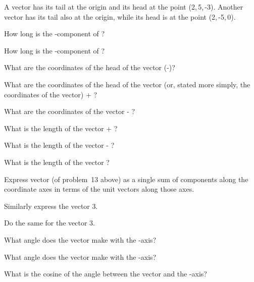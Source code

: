 {\begin{one-digit-list}
\item [13.] A vector  has its tail at the origin and its head at the
point (2,\,5,\,-3).
Another vector  has its tail also at the origin, while its head is at
the point (2,\,-5,\,0).
\begin{one-digit-list}
\item [a.] How long is the -component of ?
\item [b.] How long is the -component of ?
\item [c.] What are the coordinates of the head of the vector (-)?
\item [d.] What are the coordinates of the head of the vector (or, stated more
simply, the coordinates of the vector)  + ?
\item [e.] What are the coordinates of the vector  - ?
\item [f.] What is the length of the vector  + ?
\item [g.] What is the length of the vector  - ?
\item [h.] What is the length of the vector ?
\end{one-digit-list}

\item [14.] Express vector  (of problem~13 above) as a single sum of
components along the coordinate axes in  terms of the unit vectors along
those axes.
%

\item [15.] Similarly express the vector 3.

\item [16.] Do the same for the vector 3.

\item [17.] What angle does the vector  make with the
-axis?

\item [18.] What angle does the vector  make with the
-axis?

\item [19.] What is the cosine of the angle between the vector  and
the -axis?


\end{one-digit-list}}
